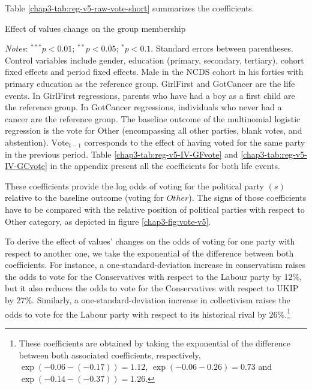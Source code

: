 Table \ref{chap3-tab:reg-v5-raw-vote-short} summarizes the coefficients. 
\begin{table}[!tb]
    \centering
    \caption{Effect of values change on the group membership}
    \label{chap3-tab:reg-v5-raw-vote-short}
    \begin{threeparttable}
        
        \begin{tablenotes}[flushleft]
            \footnotesize{\item \textit{Notes}: $^{***}p<0.01$; $^{**}p<0.05$; $^{*}p<0.1$. Standard errors between parentheses. Control variables include gender, education (primary, secondary, tertiary), cohort fixed effects and period fixed effects. Male in the NCDS cohort in his forties with primary education as the reference group. GirlFirst and GotCancer are the life events. In GirlFirst regressions, parents who have had a boy as a first child are the reference group. In GotCancer regressions, individuals who never had a cancer are the reference group. 
            The baseline outcome of the multinomial logistic regression is the vote for Other (encompassing all other parties, blank votes, and abstention). $\text{Vote}_{t-1}$ corresponds to the effect of having voted for the same party in the previous period.
            Table \ref{chap3-tab:reg-v5-IV-GFvote} and \ref{chap3-tab:reg-v5-IV-GCvote} in the appendix present all the coefficients for both life events.}
        \end{tablenotes}
    \end{threeparttable}
\end{table}
These coefficients provide the log odds of voting for the political party $(s)$ relative to the baseline outcome (voting for $Other$). The signs of those coefficients have to be compared with the relative position of political parties with respect to Other category, as depicted in figure \ref{chap3-fig:vote-v5}. 

To derive the effect of values' changes on the odds of voting for one party with respect to another one, we take the exponential of the difference between both coefficients.
For instance, a one-standard-deviation increase in conservatism raises the odds to vote for the Conservatives with respect to the Labour party by 12\%, but it also reduces the odds to vote for the Conservatives with respect to UKIP by 27\%.
Similarly, a one-standard-deviation increase in collectivism raises the odds to vote for the Labour party with respect to its historical rival by 26\%.\footnote{These coefficients are obtained by taking the exponential of the difference between both associated coefficients, respectively, $\exp(-0.06-(-0.17)) = 1.12$, $\exp(-0.06-0.26) = 0.73$ and $\exp(-0.14-(-0.37)) = 1.26$.}

